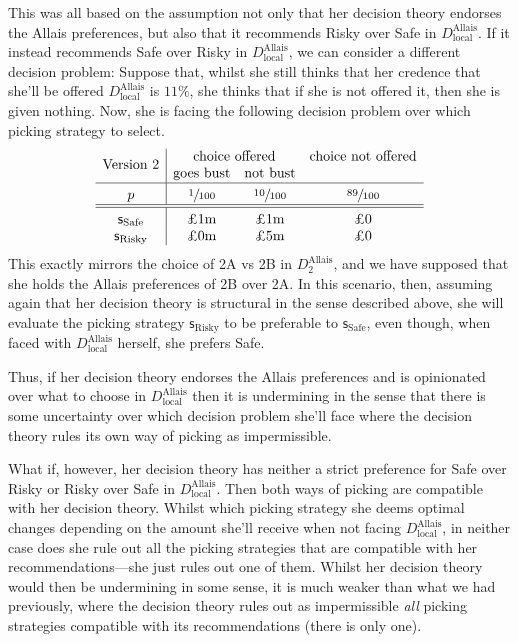 \documentclass[a4paper]{article}
\newcommand\Tstrut{\rule{0pt}{2.6ex}}       %
\newcommand\Bstrut{\rule[-0.9ex]{0pt}{0pt}} %
\newcommand\s{\mathsf{s}}
\newenvironment{CCM rewritten}
{\begingroup\color{blue}} %
{\endgroup}              %
\begin{document}
This was all based on the assumption not only that her decision theory endorses the Allais preferences, but also that it recommends Risky over Safe in $D^{\mathrm{Allais}}_{\mathrm{local}}$. If it instead recommends Safe over Risky in $D^{\mathrm{Allais}}_{\mathrm{local}}$, we can consider a different decision problem: Suppose that, whilst she still thinks that her credence that she'll be offered $D^{\mathrm{Allais}}_{\mathrm{local}}$ is $11\%$, she thinks that if she is not offered it, then she is given nothing. 
Now, she is facing the following decision problem over which picking strategy to select. 
$$
\begin{array}{c|ccc}
	\multirow{2}{*}{\text{Version 2}}	&\multicolumn{2}{c}{\text{choice offered}}&\text{choice not offered}\\
	& \text{goes bust} &  \text{not bust}  \Bstrut \\\hline \Tstrut	p&  \sfrac{1}{100} &  \sfrac{10}{100} &  \sfrac{89}{100} \Bstrut \\\hline \hline\Tstrut 
	\s_{\mathrm{Safe}} & \text{\pounds 1m}&\text{\pounds 1m}         &\text{\pounds 0}               \\
	\s_{\mathrm{Risky}}& \text{\pounds 0m}&\text{\pounds 5m}& \text{\pounds 0}
\end{array}
$$
This exactly mirrors the choice of 2A vs 2B in $D^{\mathrm{Allais}}_2$, and we have supposed that she holds the Allais preferences of 2B over 2A. In this scenario, then, assuming again that her decision theory is structural in the sense described above, she will evaluate the picking strategy $\s_{\mathrm{Risky}}$ to be preferable to $\s_{\mathrm{Safe}}$, even though, when faced with  $D^{\mathrm{Allais}}_{\mathrm{local}}$ herself, she prefers Safe. %

Thus, if her decision theory endorses the Allais preferences and is opinionated over what to choose in $D^{\mathrm{Allais}}_{\mathrm{local}}$ then it is undermining in the sense that there is some uncertainty over which decision problem she'll face where the decision theory rules its own way of picking as impermissible. 

What if, however, her decision theory has neither a strict preference for Safe over Risky or Risky over Safe in $D^{\mathrm{Allais}}_{\mathrm{local}}$. Then both ways of picking are compatible with her decision theory. Whilst which picking strategy she deems optimal changes depending on the amount she'll receive when not facing $D^{\mathrm{Allais}}_{\mathrm{local}}$, in neither case does she rule out all the picking strategies that are compatible with her recommendations---she just rules out one of them. Whilst her decision theory would then be undermining in some sense, it is much weaker than what we had previously, where the decision theory rules out as impermissible \textit{all} picking strategies compatible with its recommendations (there is only one).%
\end{document}

